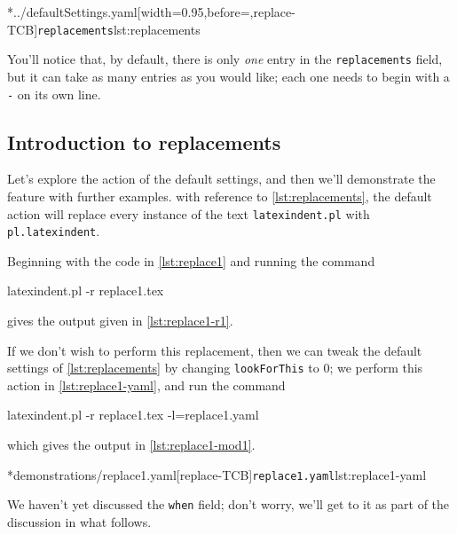  \cmhlistingsfromfile*[style=replacements]*{../defaultSettings.yaml}[width=0.95\linewidth,before=\centering,replace-TCB]{\texttt{replacements}}{lst:replacements}

 You'll notice that, by default, there is only \emph{one} entry in the
 \texttt{replacements} field, but it can take as many entries as you would like; each
 one needs to begin with a \texttt{-} on its own line.


\subsection{Introduction to replacements}
	Let's explore the action of the default settings, and then we'll demonstrate the feature
	with further examples. with reference to \cref{lst:replacements}, the default action will
	replace every instance of the text \texttt{latexindent.pl} with \texttt{pl.latexindent}.

	Beginning with the code in \cref{lst:replace1} and running the command
	\begin{commandshell}
latexindent.pl -r replace1.tex
\end{commandshell}
	gives the output given in \cref{lst:replace1-r1}.

	\begin{cmhtcbraster}[raster column skip=.01\linewidth]
	\end{cmhtcbraster}

	If we don't wish to perform this replacement, then we can tweak the default settings of
	\vref{lst:replacements} by changing \texttt{lookForThis} to 0; we perform this action
	in \cref{lst:replace1-yaml}, and run the command
	\begin{commandshell}
latexindent.pl -r replace1.tex -l=replace1.yaml
\end{commandshell}
	which gives the output in \cref{lst:replace1-mod1}.

	\begin{cmhtcbraster}[raster column skip=.01\linewidth]
		\cmhlistingsfromfile*[style=yaml-LST]*{demonstrations/replace1.yaml}[replace-TCB]{\texttt{replace1.yaml}}{lst:replace1-yaml}
	\end{cmhtcbraster}
	We haven't yet discussed the \texttt{when} field; don't worry, we'll get to it
	as part of the discussion in what follows.

